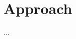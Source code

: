 \documentclass[a4paper, 12pt]{article}
\begin{document}
\section{Approach}
...
%        
%
%
%
%
%
\end{document}
